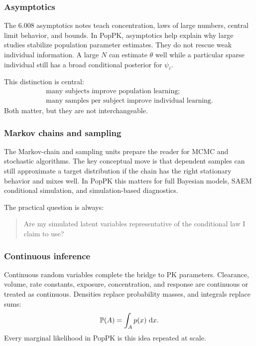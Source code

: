 \subsubsection*{Asymptotics}

The 6.008 asymptotics notes teach concentration, laws of large numbers, central limit behavior, and bounds.  In PopPK, asymptotics help explain why large studies stabilize population parameter estimates.  They do not rescue weak individual information.  A large \(N\) can estimate \(\theta\) well while a particular sparse individual still has a broad conditional posterior for \(\psi_i\).

This distinction is central:
\[
  \begin{array}{c}
    \text{many subjects improve population learning;}\\
    \text{many samples per subject improve individual learning.}
  \end{array}
\]
Both matter, but they are not interchangeable.

\subsubsection*{Markov chains and sampling}

The Markov-chain and sampling units prepare the reader for MCMC and stochastic algorithms.  The key conceptual move is that dependent samples can still approximate a target distribution if the chain has the right stationary behavior and mixes well.  In PopPK this matters for full Bayesian models, SAEM conditional simulation, and simulation-based diagnostics.

The practical question is always:
\begin{quote}
  Are my simulated latent variables representative of the conditional law I claim to use?
\end{quote}

\subsubsection*{Continuous inference}

Continuous random variables complete the bridge to PK parameters.  Clearance, volume, rate constants, exposure, concentration, and response are continuous or treated as continuous.  Densities replace probability masses, and integrals replace sums:
\[
  \mathbb{P}(A)=\int_A p(x)\,\mathop{}\!\mathrm{d} x.
\]
Every marginal likelihood in PopPK is this idea repeated at scale.


